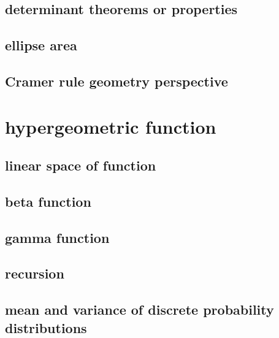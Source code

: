 \documentclass[
]{book}
\theoremstyle{definition}
\theoremstyle{definition}
\theoremstyle{definition}
\theoremstyle{definition}
\theoremstyle{remark}
\begin{document}
\hypertarget{determinant-theorems-or-properties}{%
\section{determinant theorems or properties}\label{determinant-theorems-or-properties}}

\hypertarget{ellipse-area}{%
\section{ellipse area}\label{ellipse-area}}

\hypertarget{cramer-rule-geometry-perspective}{%
\section{Cramer rule geometry perspective}\label{cramer-rule-geometry-perspective}}

\hypertarget{hypergeometric-function}{%
\chapter{hypergeometric function}\label{hypergeometric-function}}

\hypertarget{linear-space-of-function}{%
\section{linear space of function}\label{linear-space-of-function}}

\hypertarget{beta-function}{%
\section{beta function}\label{beta-function}}

\hypertarget{gamma-function}{%
\section{gamma function}\label{gamma-function}}

\hypertarget{recursion}{%
\section{recursion}\label{recursion}}

\hypertarget{mean-and-variance-of-discrete-probability-distributions}{%
\section{mean and variance of discrete probability distributions}\label{mean-and-variance-of-discrete-probability-distributions}}
\end{document}
